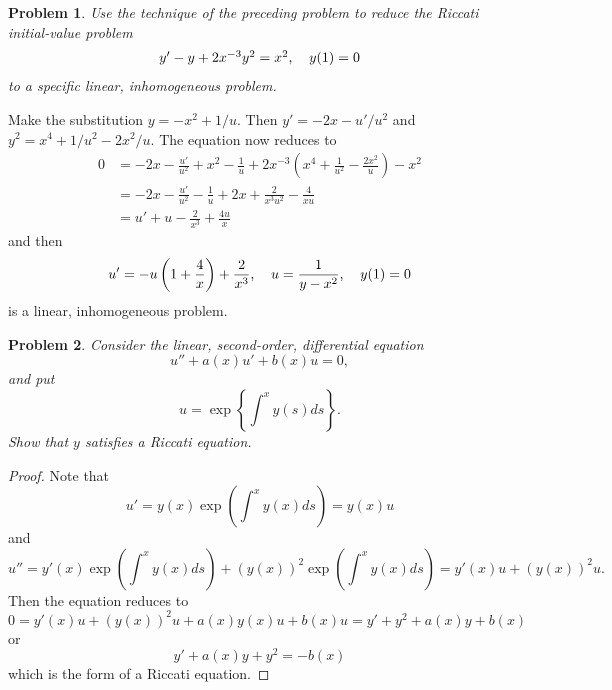 \documentclass{article}
\newtheorem{problem}{Problem}
\begin{document}
\begin{problem}
Use the technique of the preceding problem to reduce the Riccati initial-value problem
\[
\begin{tabular}{cc}
$y' - y + 2x^{-3}y^2 = x^2$, & $y(1) = 0$
\end{tabular}
\]
to a specific linear, inhomogeneous problem.
\end{problem}

Make the substitution $y = -x^2 + 1/u$. Then $y' = -2x - u'/u^2$ and $y^2 = x^4 + 1/u^2 - 2x^2/u$. The equation now reduces to
\begin{align*}
0
&= -2x - \frac{u'}{u^2} + x^2 - \frac{1}{u} + 2x^{-3} \left ( x^4 + \frac{1}{u^2} - \frac{2x^2}{u} \right ) - x^2\\
&= -2x - \frac{u'}{u^2} - \frac{1}{u} + 2x + \frac{2}{x^3u^2} - \frac{4}{xu}\\
&= u' + u - \frac{2}{x^3} + \frac{4u}{x}
\end{align*}
and then
\[
\begin{tabular}{ccc}
$\displaystyle{u' = -u \left ( 1 + \frac{4}{x} \right ) + \frac{2}{x^3}}$, & $\displaystyle{u = \frac{1}{y-x^2}}$, & $\displaystyle{y(1) = 0}$
\end{tabular}
\]
is a linear, inhomogeneous problem.

\begin{problem}
Consider the linear, second-order, differential equation
\[
u'' + a(x)u' + b(x)u = 0,
\]
and put
\[
u = \exp \left \{ \int^x y(s) ds \right \}.
\]
Show that $y$ satisfies a Riccati equation.
\end{problem}
\begin{proof}
Note that
\[
u' = y(x) \exp \left (\int^x y(x) ds \right ) = y(x) u
\]
and
\[
u'' = y'(x) \exp \left (\int^x y(x) ds \right ) + (y(x))^2 \exp \left (\int^x y(x) ds \right ) = y'(x) u + (y(x))^2 u.
\]
Then the equation reduces to
\[
0 = y'(x) u + (y(x))^2 u + a(x) y(x) u + b(x) u = y' + y^2 + a(x) y + b(x)
\]
or
\[
y' + a(x) y + y^2 = -b(x)
\]
which is the form of a Riccati equation.
\end{proof}
\end{document}
